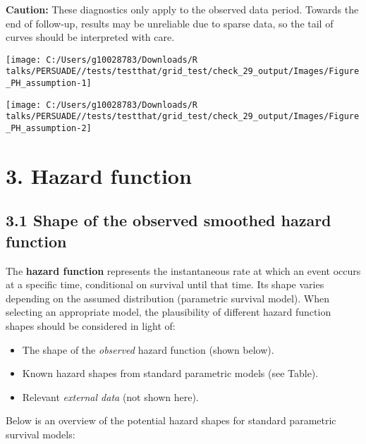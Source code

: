 \documentclass[
]{article}
\providecommand{\tightlist}{%
  \setlength{\itemsep}{0pt}\setlength{\parskip}{0pt}}
\begin{document}
\textbf{Caution:} These diagnostics only apply to the observed data
period. Towards the end of follow-up, results may be unreliable due to
sparse data, so the tail of curves should be interpreted with care.

\clearpage

\begin{flushleft}\texttt{[image: C:/Users/g10028783/Downloads/R talks/PERSUADE//tests/testthat/grid\_test/check\_29\_output/Images/Figure\_PH\_assumption-1]} \end{flushleft}

\begin{flushleft}\texttt{[image: C:/Users/g10028783/Downloads/R talks/PERSUADE//tests/testthat/grid\_test/check\_29\_output/Images/Figure\_PH\_assumption-2]} \end{flushleft}

\clearpage

\section{3. Hazard function}\label{hazard-function}

\subsection{3.1 Shape of the observed smoothed hazard
function}\label{shape-of-the-observed-smoothed-hazard-function}

The \textbf{hazard function} represents the instantaneous rate at which
an event occurs at a specific time, conditional on survival until that
time. Its shape varies depending on the assumed distribution (parametric
survival model). When selecting an appropriate model, the plausibility
of different hazard function shapes should be considered in light of:

\begin{itemize}
\tightlist
\item
  The shape of the \emph{observed} hazard function (shown below).
\item
  Known hazard shapes from standard parametric models (see Table).
\item
  Relevant \emph{external data} (not shown here).
\end{itemize}

Below is an overview of the potential hazard shapes for standard
parametric survival models:
\end{document}
